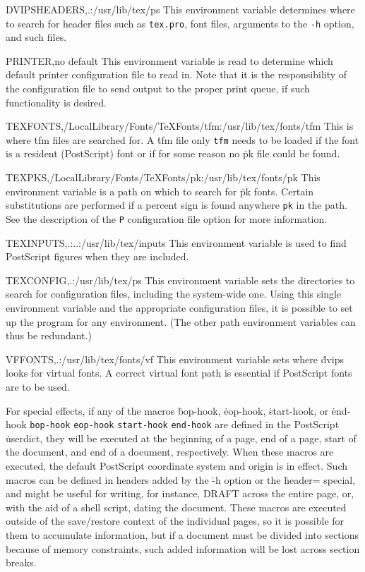 \descenv DVIPSHEADERS,{.:/usr/lib/tex/ps}
  This environment variable determines where to search for header
files such as {\tt tex.pro}, font files, arguments to the
{\tt -h} option, and such files.

\descenv PRINTER,{\rm no default}
  This environment variable is read to determine which default printer
configuration file to read in.  Note that it is the responsibility of
the configuration file to send output to the proper print queue, if such
functionality is desired.

\descenv TEXFONTS,{/LocalLibrary/Fonts/TeXFonts/tfm:/usr/lib/tex/fonts/tfm}
  This is where \.{tfm} files are searched for.  A \.{tfm} file only
\^{{\tt tfm}}
needs to be loaded if the font is a resident (PostScript) font or if
for some reason no \.{pk} file could be found.

\descenv TEXPKS,{/LocalLibrary/Fonts/TeXFonts/pk:/usr/lib/tex/fonts/pk}
This environment variable is a path on which to search for \.{pk} fonts.
Certain substitutions are performed if a percent sign is found anywhere
\^{{\tt pk}}
in the path.  See the description of the {\tt P} configuration file
option for more information.

\descenv TEXINPUTS,{.:..:/usr/lib/tex/inputs}
  This environment variable is used to find PostScript figures when they
are included.

\descenv TEXCONFIG,{.:/usr/lib/tex/ps}
  This environment variable sets the directories to search for configuration
files, including the system-wide one.  Using this single environment variable
and the appropriate configuration files, it is possible to set up the program
for any environment.  (The other path environment variables can thus be
redundant.)

\descenv VFFONTS,{.:/usr/lib/tex/fonts/vf}
  This environment variable sets where \.{dvips} looks for virtual fonts.
A correct virtual font path is essential if PostScript fonts are to be
used.


For special effects, if any of the macros
\.{bop-hook}, \.{eop-hook}, \.{start-hook}, or \.{end-hook}
\^{{\tt bop-hook}}
\^{{\tt eop-hook}}
\^{{\tt start-hook}}
\^{{\tt end-hook}}
are defined in the PostScript \.{userdict}, they will be executed at the
beginning of a page, end of a page, start of the document, and end of
a document, respectively.
When these macros are executed, the default PostScript coordinate system
and origin
is in effect.  Such macros can be defined in headers added by the
\.{-h} option or the \.{header=}
special, and might be useful for writing, for instance, DRAFT across the
entire page, or, with the aid of a shell script, dating the document.
These macros are executed outside of the save/restore context of the
individual pages, so it is possible for them to accumulate information,
but if a document must be divided into sections because of memory
constraints, such added information will be lost across section breaks.

